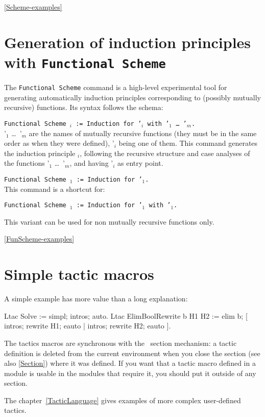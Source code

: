\SeeAlso \ref{Scheme-examples}


\section{Generation of induction principles with {\tt Functional Scheme}}
\label{FunScheme}

The {\tt Functional Scheme} command is a high-level experimental
tool for generating automatically induction principles
corresponding to (possibly mutually recursive) functions.  Its
syntax follows the schema:\bigskip

\noindent
{\tt Functional Scheme {\ident$_i$} := Induction for
    \ident'$_i$ with \ident'$_1$ \dots\ \ident'$_m$.}\\
  
  \ident'$_1$ \dots\ \ident'$_m$ are the names of mutually
  recursive functions (they must be in the same order as when
  they were defined), \ident'$_i$ being one of them. This command
  generates the induction principle \ident$_i$, following the
  recursive structure and case analyses of the functions
  \ident'$_1$ \dots\ \ident'$_m$, and having \ident'$_i$ as entry
  point.

\begin{Variants}
\item {\tt Functional Scheme {\ident$_1$} := Induction for \ident'$_1$.}\\
  
  This command is a shortcut for:
  
  {\tt Functional Scheme {\ident$_1$} := Induction for
    \ident'$_1$ with \ident'$_1$.}

  This variant can be used for non mutually recursive functions only.
\end{Variants}

\SeeAlso \ref{FunScheme-examples}


\section{Simple tactic macros}
\label{TacticDefinition}

A simple example has more value than a long explanation: 

\begin{coq_example}
Ltac Solve := simpl; intros; auto.
Ltac ElimBoolRewrite b H1 H2 :=
  elim b; [ intros; rewrite H1; eauto | intros; rewrite H2; eauto ].
\end{coq_example}

The tactics macros are synchronous with the \Coq\ section mechanism:
a tactic definition is deleted from the current environment
when you close the section (see also \ref{Section}) 
where it was defined. If you want that a
tactic macro defined in a module is usable in the modules that
require it, you should put it outside of any section.

The chapter~\ref{TacticLanguage} gives examples of more complex
user-defined tactics.



